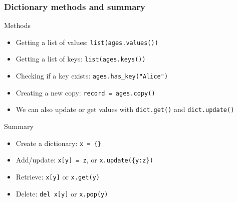 \documentclass[notes]{beamer}
\begin{document}
		
	\begin{frame}[fragile]
		\frametitle{Dictionary methods and summary}
		Methods
		\begin{itemize}
			\item Getting a list of values: \lstinline|list(ages.values())|
			\item Getting a list of keys: \lstinline|list(ages.keys())|
			\item Checking if a key exists: \lstinline|ages.has_key("Alice")|
			\item Creating a new copy: \lstinline|record = ages.copy()|
			\item We can also update or get values with \lstinline|dict.get()| and \lstinline|dict.update()|
		\end{itemize}
		Summary
		\begin{itemize}
			\item Create a dictionary: \lstinline|x = {}|
			\item Add/update: \lstinline|x[y] = z|, or \lstinline|x.update({y:z})|
			\item Retrieve: \lstinline|x[y]| or \lstinline|x.get(y)|
			\item Delete: \lstinline|del x[y]| or \lstinline|x.pop(y)|
		\end{itemize}
	\end{frame}
	
\end{document}
